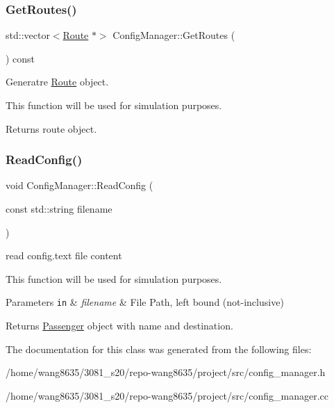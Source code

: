 \subsubsection{\texorpdfstring{Get\+Routes()}{GetRoutes()}}
{\footnotesize\ttfamily std\+::vector$<$\hyperlink{classRoute}{Route} $\ast$$>$ Config\+Manager\+::\+Get\+Routes (\begin{DoxyParamCaption}{ }\end{DoxyParamCaption}) const\hspace{0.3cm}{\ttfamily [inline]}}



Generatre \hyperlink{classRoute}{Route} object. 

This function will be used for simulation purposes.

\begin{DoxyReturn}{Returns}
route object. 
\end{DoxyReturn}
\mbox{\label{classConfigManager_ab8087a9f44ddaa001ea361b56514e64a}} 
\subsubsection{\texorpdfstring{Read\+Config()}{ReadConfig()}}
{\footnotesize\ttfamily void Config\+Manager\+::\+Read\+Config (\begin{DoxyParamCaption}\item[{const std\+::string}]{filename }\end{DoxyParamCaption})}



read config.\+text file content 

This function will be used for simulation purposes.


\begin{DoxyParams}[1]{Parameters}
\mbox{\tt in}  & {\em filename} & File Path, left bound (not-\/inclusive)\\
\hline
\end{DoxyParams}
\begin{DoxyReturn}{Returns}
\hyperlink{classPassenger}{Passenger} object with name and destination. 
\end{DoxyReturn}


The documentation for this class was generated from the following files\+:\begin{DoxyCompactItemize}
\item 
/home/wang8635/3081\+\_\+s20/repo-\/wang8635/project/src/config\+\_\+manager.\+h\item 
/home/wang8635/3081\+\_\+s20/repo-\/wang8635/project/src/config\+\_\+manager.\+cc\end{DoxyCompactItemize}
